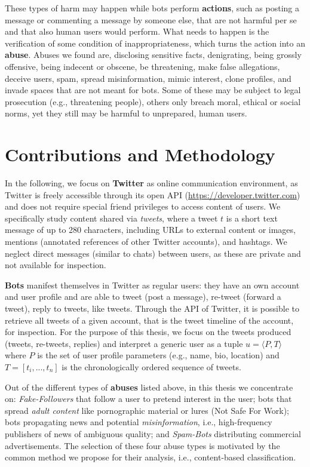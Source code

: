 These types of harm may happen while bots perform  \textbf{actions}, such as posting a message or commenting a message by someone else, that are not harmful per se and that also human users would perform. What needs to happen is the verification of some condition of inappropriateness, which turns the action into an \textbf{abuse}. Abuses we found are, disclosing sensitive facts, denigrating, being grossly offensive, being indecent or obscene, be threatening, make false allegations, deceive users, spam, spread misinformation, mimic interest, clone profiles, and invade spaces that are not meant for bots. Some of these may be subject to legal prosecution (e.g., threatening people), others only breach moral, ethical or social norms, yet they still may be harmful to unprepared, human users.

\section{Contributions and Methodology}
\label{sec:contributions}
In the following, we focus on \textbf{Twitter} as online communication environment, as Twitter is freely accessible through its open API (\url{https://developer.twitter.com}) and does not require special friend privileges to access content of users. We specifically study content shared via \emph{tweets}, where a tweet $t$ is a short text message of up to 280 characters, including URLs to external content or images, mentions (annotated references of other Twitter accounts), and hashtags. We neglect direct messages (similar to chats) between users, as these are private and not available for inspection. 

\textbf{Bots} manifest themselves in Twitter as regular users: they have an own account and user profile and are able to tweet (post a message), re-tweet (forward a tweet), reply to tweets, like tweets. Through the API of Twitter, it is possible to retrieve all tweets of a given account, that is the tweet timeline of the account, for inspection. For the purpose of this thesis, we focus on the tweets produced (tweets, re-tweets, replies) and interpret a generic user as a tuple $u = \langle P, T \rangle$ where $P$ is the set of 
user profile parameters (e.g., name, bio, location) and $T = [t_i,...,t_n]$ is the chronologically ordered sequence of tweets.

Out of the different types of \textbf{abuses} listed above, in this thesis we concentrate on: \emph{Fake-Followers} that follow a user to pretend interest in the user; bots that spread \emph{adult content} like pornographic material or lures (Not Safe For Work); bots propagating news and potential \emph{misinformation}, i.e., high-frequency publishers of news of ambiguous quality; and \emph{Spam-Bots} distributing commercial advertisements. The selection of these four abuse types is motivated by the common method we propose for their analysis, i.e., content-based classification.

